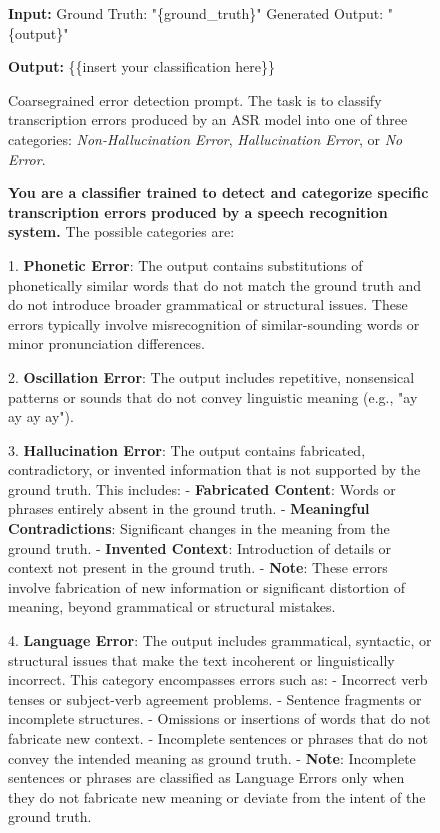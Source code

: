 \begin{figure*}[h]
\begin{tcolorbox}
    \textbf{Input:}  
    Ground Truth: "\{ground\_truth\}"  
    Generated Output: "\{output\}"  

    \textbf{Output:} \{\{insert your classification here\}\}
    \end{tcolorbox}
    \caption{Coarsegrained error detection prompt. The task is to classify transcription errors produced by an ASR model into one of three categories: \textit{Non-Hallucination Error}, \textit{Hallucination Error}, or \textit{No Error}.}
    \label{fig:coarsegrained_prompt}
\end{figure*}


\begin{figure*}[h]
    \centering
    \begin{tcolorbox}
    \small
    \textbf{You are a classifier trained to detect and categorize specific transcription errors produced by a speech recognition system.} The possible categories are:

    1. \textbf{Phonetic Error}: The output contains substitutions of phonetically similar words that do not match the ground truth and do not introduce broader grammatical or structural issues. These errors typically involve misrecognition of similar-sounding words or minor pronunciation differences.

    2. \textbf{Oscillation Error}: The output includes repetitive, nonsensical patterns or sounds that do not convey linguistic meaning (e.g., "ay ay ay ay").

    3. \textbf{Hallucination Error}: The output contains fabricated, contradictory, or invented information that is not supported by the ground truth. This includes:
       - \textbf{Fabricated Content}: Words or phrases entirely absent in the ground truth.
       - \textbf{Meaningful Contradictions}: Significant changes in the meaning from the ground truth.
       - \textbf{Invented Context}: Introduction of details or context not present in the ground truth.  
       - \textbf{Note}: These errors involve fabrication of new information or significant distortion of meaning, beyond grammatical or structural mistakes.

    4. \textbf{Language Error}: The output includes grammatical, syntactic, or structural issues that make the text incoherent or linguistically incorrect. This category encompasses errors such as:
       - Incorrect verb tenses or subject-verb agreement problems.
       - Sentence fragments or incomplete structures.
       - Omissions or insertions of words that do not fabricate new context.
       - Incomplete sentences or phrases that do not convey the intended meaning as ground truth.  
       - \textbf{Note}: Incomplete sentences or phrases are classified as Language Errors only when they do not fabricate new meaning or deviate from the intent of the ground truth.


\end{tcolorbox}
\end{figure*}
